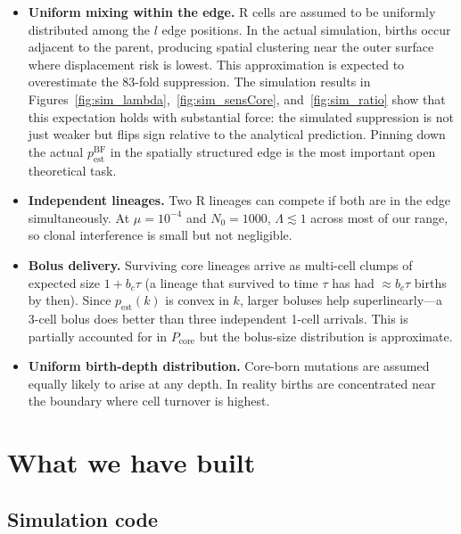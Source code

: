 \documentclass[12pt]{article}
\begin{document}
\begin{itemize}
    \item \textbf{Uniform mixing within the edge.} R cells are assumed to be
    uniformly distributed among the $l$ edge positions. In the actual
    simulation, births occur adjacent to the parent, producing spatial
    clustering near the outer surface where displacement risk is lowest.
    This approximation is expected to overestimate the 83-fold suppression.
    The simulation results in
    Figures~\ref{fig:sim_lambda},~\ref{fig:sim_sensCore}, and~\ref{fig:sim_ratio}
    show that this expectation holds with substantial force: the simulated
    suppression is not just weaker but flips sign relative to the analytical
    prediction. Pinning down the actual $p_{\text{est}}^{\text{BF}}$ in the
    spatially structured edge is the most important open theoretical task.

    \item \textbf{Independent lineages.} Two R lineages can compete if both
    are in the edge simultaneously. At $\mu = 10^{-4}$ and $N_0 = 1000$,
    $\Lambda \lesssim 1$ across most of our range, so clonal interference is
    small but not negligible.

    \item \textbf{Bolus delivery.} Surviving core lineages arrive as
    multi-cell clumps of expected size $1 + b_c \tau$ (a lineage that
    survived to time $\tau$ has had $\approx b_c \tau$ births by then). Since
    $p_{\text{est}}(k)$ is convex in $k$, larger boluses help
    superlinearly---a 3-cell bolus does better than three independent
    1-cell arrivals. This is partially accounted for in $P_{\text{core}}$ but
    the bolus-size distribution is approximate.

    \item \textbf{Uniform birth-depth distribution.} Core-born mutations are
    assumed equally likely to arise at any depth. In reality births are
    concentrated near the boundary where cell turnover is highest.
\end{itemize}


\section{What we have built}
\label{sec:built}

\subsection{Simulation code}
\end{document}
